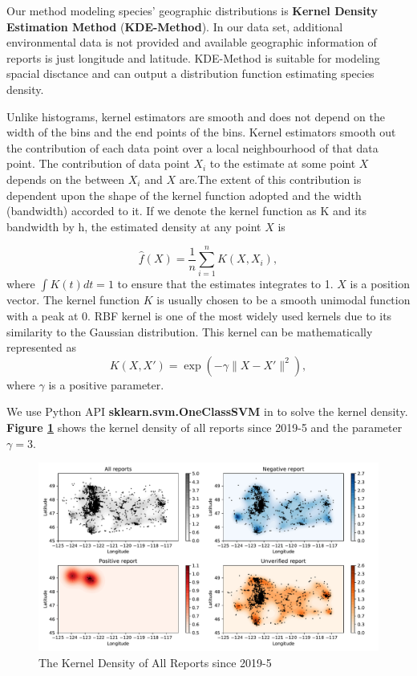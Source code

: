 \documentclass[12pt]{article}
\begin{document}
Our method modeling species’ geographic distributions is \textbf{Kernel Density Estimation Method} (\textbf{KDE-Method})\cite{1}. In our data set, additional environmental data is not provided and available geographic information of reports is just longitude and latitude. KDE-Method is suitable for modeling spacial disctance and can output a distribution function estimating species density.

Unlike histograms, kernel estimators are smooth and does not depend on the width of the bins and the end points of the bins. Kernel estimators smooth out the contribution of each data point over a local neighbourhood of that data point. The contribution of data point $X_i$ to the estimate at some point $X$ depends on the  between $X_i$ and $X$ are.The extent of this contribution is dependent upon the shape of the kernel function adopted and the width (bandwidth) accorded to it. If we denote the kernel function as K and its bandwidth by h, the estimated density at any point $X$ is

\begin{equation}
\hat{{f}}(X)=\frac{1}{n}\sum_{i=1}^{n}K\left(X, X_i\right),
\end{equation}
where $\int K(t)dt=1$ to ensure that the estimates  integrates to 1. $X$ is a position vector. The kernel function $K$ is usually chosen to be a smooth unimodal function with a peak at 0. RBF kernel is one of the most widely used kernels due to its similarity to the Gaussian distribution. This kernel can be mathematically represented as
\begin{equation}
	K\left(X, X'\right)=\exp(-\gamma \|X-X'\|^2),
	\label{gamma}
\end{equation}
where $\gamma $ is a positive parameter.

We use Python API \textbf{sklearn.svm.OneClassSVM} in to solve the kernel density. \textbf{Figure \ref{species_svm}} shows the kernel density of all reports since 2019-5 and the parameter $\gamma =3$.
\begin{figure}[H]%
	\small
	\centering
	\includegraphics[width=17cm]{./pictures/species_svm}
	\caption{The Kernel Density of All Reports since 2019-5}\label{species_svm}
\end{figure}
\end{document}
